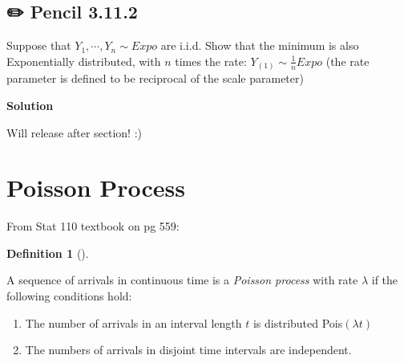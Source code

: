 \documentclass[
  letterpaper,
  DIV=11,
  numbers=noendperiod]{scrreprt}
\theoremstyle{definition}
\newtheorem{definition}{Definition}[chapter]
\theoremstyle{plain}
\theoremstyle{remark}
\begin{document}
\hypertarget{pencil-3.11.2}{%
\subsection*{✏️ Pencil 3.11.2}\label{pencil-3.11.2}}

Suppose that \(Y_1, \cdots, Y_n \sim Expo\) are i.i.d. Show that the
minimum is also Exponentially distributed, with \(n\) times the rate:
\(Y_{(1)} \sim \frac{1}{n} Expo\) (the rate parameter is defined to be
reciprocal of the scale parameter)

\begin{tcolorbox}[enhanced jigsaw, leftrule=.75mm, colframe=quarto-callout-tip-color-frame, colback=white, breakable, opacityback=0, left=2mm, bottomrule=.15mm, arc=.35mm, rightrule=.15mm, toprule=.15mm]
\begin{minipage}[t]{5.5mm}
\textcolor{quarto-callout-tip-color}{\faLightbulb}
\end{minipage}%
\begin{minipage}[t]{\textwidth - 5.5mm}

\textbf{Solution}\vspace{2mm}

Will release after section! :)

\end{minipage}%
\end{tcolorbox}

\hypertarget{poisson-process}{%
\section*{Poisson Process}\label{poisson-process}}


From Stat 110 textbook on pg 559:

\leavevmode{}%
\begin{definition}[]\label{def-poisson-process}

A sequence of arrivals in continuous time is a \emph{Poisson process}
with rate \(\lambda\) if the following conditions hold:

\begin{enumerate}
\def\labelenumi{\arabic{enumi}.}
\item
  The number of arrivals in an interval length \(t\) is distributed
  Pois\((\lambda t)\)
\item
  The numbers of arrivals in disjoint time intervals are independent.
\end{enumerate}

\end{definition}
\end{document}
